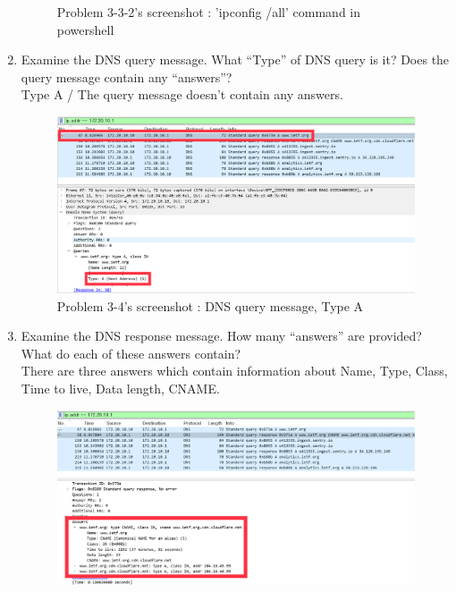 \begin{enumerate}[label=\bfseries Problem \arabic*:,leftmargin=*,labelindent=1em]
\begin{figure}[!h]
        		\caption{\footnotesize Problem 3-3-2's screenshot : 'ipconfig /all' command in powershell}
        		\vspace{-10pt}
            \end{figure}
        \item Examine the DNS query message. What “Type” of DNS query is it? 
        Does the query message contain any “answers”?\\[0.2mm]
            \soln Type A / The query message doesn’t contain any answers.
            \vspace{-2mm}  
            \begin{figure}[!h]\centering
        		\includegraphics[width=.78\textwidth]{image/result_week01/Q3-4.png}
        		\caption{\footnotesize Problem 3-4's screenshot : DNS query message, Type A}
        		\vspace{-10pt}
            \end{figure}
\newpage
        \item Examine the DNS response message. How many “answers” are provided? 
        What do each of these answers contain?\\[0.2mm]
            \soln There are three answers which contain information about Name, Type, Class, Time to live, Data length, CNAME.
             \vspace{-2mm}  
            \begin{figure}[!h]\centering
        		\includegraphics[width=.78\textwidth]{image/result_week01/Q3-5.png}

\end{figure}
\end{enumerate}
